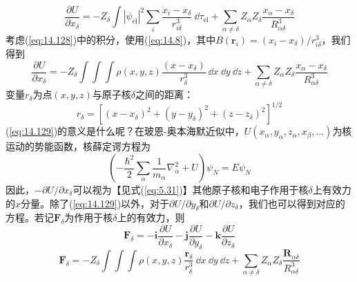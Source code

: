     \begin{equation}
        \frac{\partial U}{\partial x_{\delta}} = - Z_{\delta} \int \left|\psi_{\text{el}}\right|^2 \sum_i \frac{x_{i} - x_{\delta}}{r_{i\delta}^3} \:\dd \tau_{\text{el}} + \sum_{\alpha \neq \delta} Z_{\alpha} Z_{\delta} \frac{x_{\alpha} - x_{\delta}}{R_{\alpha\delta}^3}
        \label{eq:14.128}
    \end{equation}
    考虑(\ref{eq:14.128})中的积分，使用(\ref{eq:14.8})，其中$B\left(\mathbf{r}_i\right) = \left(x_i - x_{\delta}\right) / r_{i\delta}^3$，我们得到
    \begin{equation}
        \frac{\partial U}{\partial x_{\delta}} = - Z_{\delta} \int \int \int \rho \left(x,y,z\right) \frac{\left(x - x_{\delta}\right)}{r_{\delta}^3} \:\dd x \:\dd y \:\dd z + \sum_{\alpha \neq \delta} Z_{\alpha} Z_{\delta} \frac{x_{\alpha} - x_{\delta}}{R_{\alpha\delta}^3}
        \label{eq:14.129}
    \end{equation}
    变量$r_{\delta}$为点$\left(x,y,z\right)$与原子核$\delta$之间的距离：
    \begin{equation*}
        r_{\delta} = \left[\left(x - x_{\delta}\right)^2 + \left(y - y_{\delta}\right)^2 + \left(z - z_{\delta}\right)^2\right]^{1/2}
    \end{equation*}
    (\ref{eq:14.129})的意义是什么呢？在玻恩-奥本海默近似中，$U\left(x_{\alpha}, y_{\alpha}, z_{\alpha}, x_{\beta}, \ldots\right)$为核运动的势能函数，核薛定谔方程为
    \begin{equation}
        \left(-\frac{\hbar^2}{2}\sum_{\alpha}\frac{1}{m_{\alpha}}\nabla_{\alpha}^2 + U\right) \psi_N = E \psi_N
        \label{eq:14.130}
    \end{equation}
    因此，$-\partial U / \partial x_{\delta}$可以视为【见式(\ref{eq:5.31})】其他原子核和电子作用于核$\delta$上有效力的$x$分量。除了(\ref{eq:14.129})以外，对于$\partial U / \partial y_{\delta}$和$\partial U / \partial z_{\delta}$，我们也可以得到对应的方程。若记$\mathbf{F}_{\delta}$为作用于核$\delta$上的有效力，则
    \begin{equation}
        \mathbf{F}_{\delta} = -\mathbf{i} \frac{\partial U}{\partial x_{\delta}} - \mathbf{j} \frac{\partial U}{\partial y_{\delta}} - \mathbf{k} \frac{\partial U}{\partial z_{\delta}}
        \label{eq:14.131}
    \end{equation}
    \begin{equation}
        \mathbf{F}_{\delta} = - Z_{\delta} \int \int \int \rho \left(x,y,z\right) \frac{\mathbf{r}_{\delta}}{r_{\delta}^3} \:\dd x \:\dd y \:\dd z + \sum_{\alpha \neq \delta} Z_{\alpha} Z_{\delta} \frac{\mathbf{R}_{\alpha\delta}}{R_{\alpha\delta}^3}
        \label{eq:14.132}
    \end{equation}
